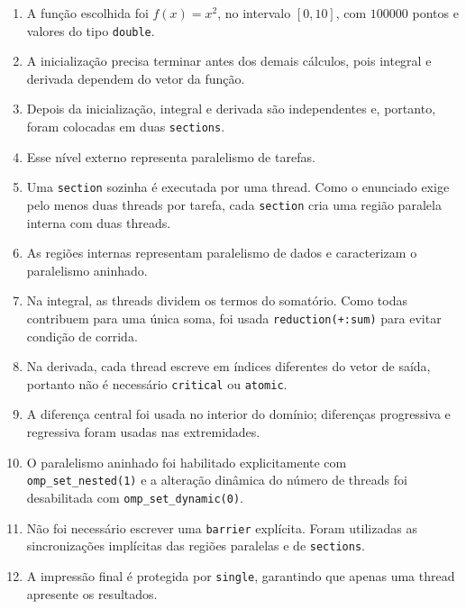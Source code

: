 \begin{enumerate}

    \item A função escolhida foi $f(x)=x^2$, no intervalo $[0,10]$, com
    $100000$ pontos e valores do tipo \texttt{double}.

    \item A inicialização precisa terminar antes dos demais cálculos, pois
    integral e derivada dependem do vetor da função.

    \item Depois da inicialização, integral e derivada são independentes e,
    portanto, foram colocadas em duas \texttt{sections}.

    \item Esse nível externo representa paralelismo de tarefas.

    \item Uma \texttt{section} sozinha é executada por uma thread. Como o
    enunciado exige pelo menos duas threads por tarefa, cada \texttt{section}
    cria uma região paralela interna com duas threads.

    \item As regiões internas representam paralelismo de dados e caracterizam
    o paralelismo aninhado.

    \item Na integral, as threads dividem os termos do somatório. Como todas
    contribuem para uma única soma, foi usada
    \texttt{reduction(+:sum)} para evitar condição de corrida.

    \item Na derivada, cada thread escreve em índices diferentes do vetor de
    saída, portanto não é necessário \texttt{critical} ou \texttt{atomic}.

    \item A diferença central foi usada no interior do domínio; diferenças
    progressiva e regressiva foram usadas nas extremidades.

    \item O paralelismo aninhado foi habilitado explicitamente com
    \texttt{omp\_set\_nested(1)} e a alteração dinâmica do número de threads
    foi desabilitada com \texttt{omp\_set\_dynamic(0)}.

    \item Não foi necessário escrever uma \texttt{barrier} explícita. Foram
    utilizadas as sincronizações implícitas das regiões paralelas e de
    \texttt{sections}.

    \item A impressão final é protegida por \texttt{single}, garantindo que
    apenas uma thread apresente os resultados.


\end{enumerate}
